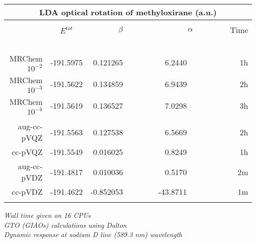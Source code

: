 \begin{frame}
\begin{table}
\centering
\begin{tabular}{r|c|rrr}
\multicolumn{5}{c}{\textbf{LDA optical rotation of methyloxirane (a.u.)}}\\
\hline
\hline
	             &               &                       &                           &               \\
                     &$E^{tot}$      
                     &\multicolumn{1}{c}{$\beta$}
                     &\multicolumn{1}{c}{$\alpha$}
                     &Time           \\
    \hspace{20mm}\   &\hspace{20mm}\ &\hspace{20mm}\         &\hspace{20mm}\             &\hspace{5mm}\ \\
    MRChem $10^{-2}$ & -191.5975     & 0.121265\ \ \ \ \ \ \ &   6.2440\ \ \ \ \ \ \ \ \ &    1h         \\
    MRChem $10^{-3}$ & -191.5622     & 0.134859\ \ \ \ \ \ \ &   6.9439\ \ \ \ \ \ \ \ \ &    2h         \\
    MRChem $10^{-4}$ & -191.5619     & 0.136527\ \ \ \ \ \ \ &   7.0298\ \ \ \ \ \ \ \ \ &    3h         \\
	             &               &                       &                           &               \\
    aug-cc-pVQZ      & -191.5563     & 0.127538\ \ \ \ \ \ \ &   6.5669\ \ \ \ \ \ \ \ \ &    2h         \\
	cc-pVQZ      & -191.5549     & 0.016025\ \ \ \ \ \ \ &   0.8249\ \ \ \ \ \ \ \ \ &    1h         \\
    aug-cc-pVDZ      & -191.4817     & 0.010036\ \ \ \ \ \ \ &   0.5170\ \ \ \ \ \ \ \ \ &    2m         \\
	cc-pVDZ      & -191.4622     &-0.852053\ \ \ \ \ \ \ & -43.8711\ \ \ \ \ \ \ \ \ &    1m         \\
	             &               &                       &                           &               \\
\hline
\hline
\end{tabular}
\end{table}

\centering
\it{Wall time given on 16 CPUs}\\
\it{GTO (GIAOs) calculations using Dalton}\\
\it{Dynamic response at sodium D line (589.3 nm) wavelength}

\end{frame}
